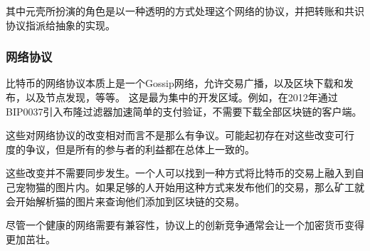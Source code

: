 \documentclass[letterpaper]{article}
\begin{document}
其中元壳所扮演的角色是以一种透明的方式处理这个网络的协议，并把转账和共识协议指派给抽象的实现。

\subsubsection{网络协议}

比特币的网络协议本质上是一个Gossip网络，允许交易广播，以及区块下载和发布，以及节点发现，等等。
这是最为集中的开发区域。例如，在2012年通过BIP0037引入布隆过滤器加速简单的支付验证，不需要下载全部区块链的客户端。

这些对网络协议的改变相对而言不是那么有争议。可能起初存在对这些改变可行
度的争议，但是所有的参与者的利益都在总体上一致的。

这些改变并不需要同步发生。一个人可以找到一种方式将比特币的交易上融入到自
己宠物猫的图片内。如果足够的人开始用这种方式来发布他们的交易，那么矿工就
会开始解析猫的图片来查询他们添加到区块链的交易。

尽管一个健康的网络需要有兼容性，协议上的创新竞争通常会让一个加密货币变得更加茁壮。
\end{document}
